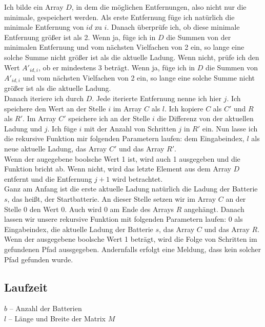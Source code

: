 \documentclass[a4paper,10pt,ngerman]{scrartcl}
\begin{document}
Ich bilde ein Array $D$, in dem die möglichen Entfernungen, also nicht nur die minimale, gespeichert werden. Als erste Entfernung
füge ich natürlich die minimale Entfernung von $id$ zu $i$. Danach überprüfe ich, ob diese minimale Entfernung größer ist als 2.
Wenn ja, füge ich in $D$ die Summen von der minimalen Entfernung und vom nächsten Vielfachen von 2 ein, so lange eine solche Summe nicht
größer ist als die aktuelle Ladung. Wenn nicht, prüfe ich den Wert $A'_{id, i}$, ob er mindestens 3 beträgt.
Wenn ja, füge ich in $D$ die Summen von $A'_{id, i}$ und vom nächsten Vielfachen von 2 ein, so lange eine solche Summe nicht
größer ist als die aktuelle Ladung.\\
Danach iteriere ich durch $D$. Jede iterierte Entfernung nenne ich hier $j$. Ich speichere den Wert an der Stelle $i$ im Array $C$ als $l$.
Ich kopiere $C$ als $C'$ und $R$ als $R'$. Im Array $C'$ speichere ich an der Stelle $i$ die Differenz von der aktuellen Ladung und $j$.
Ich füge $i$ mit der Anzahl von Schritten $j$ in $R'$ ein. Nun lasse ich die rekursive Funktion mir folgenden Parametern laufen:
dem Eingabeindex, $l$ als neue aktuelle Ladung, das Array $C'$ und das Array $R'$.\\
Wenn der augegebene boolsche Wert 1 ist, wird auch 1 ausgegeben und die Funktion bricht ab. Wenn nicht, wird das letzte Element
aus dem Array $D$ entfernt und die Entfernung $j+1$ wird betrachtet.\\

Ganz am Anfang ist die erste aktuelle Ladung natürlich die Ladung der Batterie $s$, das heißt, der Startbatterie. An dieser Stelle
setzen wir im Array $C$ an der Stelle $0$ den Wert 0. Auch wird 0 am Ende des Arrays $R$ angehängt.
Danach lassen wir unsere rekursive Funktion mit folgenden Parametern laufen: 0 als Eingabeindex, die aktuelle Ladung der Batterie $s$, 
das Array $C$ und das Array $R$.
Wenn der ausgegebene boolsche Wert 1 beträgt, wird die Folge von Schritten im gefundenen Pfad aussgegeben. Andernfalls erfolgt
eine Meldung, dass kein solcher Pfad gefunden wurde.

\subsection{Laufzeit}\label{sec:time}

$b$ -- Anzahl der Batterien\\
$l$ -- Länge und Breite der Matrix $M$\\
\end{document}
